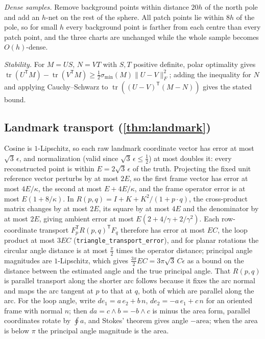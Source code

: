 \documentclass[11pt]{article}
\newcommand{\lean}[1]{\nolinkurl{#1}}
\begin{document}
\emph{Dense samples.}
Remove background points within distance $20h$ of the north pole and add an $h$-net on the rest of the sphere.
All patch points lie within $8h$ of the pole, so for small $h$ every background point is farther from each centre than every patch point, and the three charts are unchanged while the whole sample becomes $O(h)$-dense.

\emph{Stability.}
For $M=US$, $N=VT$ with $S,T$ positive definite, polar optimality gives $\operatorname{tr}(U^{\mathsf T}M)-\operatorname{tr}(V^{\mathsf T}M)\ge\tfrac12\sigma_{\min}(M)\|U-V\|_F^2$; adding the inequality for $N$ and applying Cauchy--Schwarz to $\operatorname{tr}((U-V)^{\mathsf T}(M-N))$ gives the stated bound.

\subsection{Landmark transport (\texorpdfstring{\cref{thm:landmark}}{Theorem 7.3})}
\label{app:landmark-proof}

Cosine is $1$-Lipschitz, so each raw landmark coordinate vector has error at most $\sqrt3\,\epsilon$, and normalization (valid since $\sqrt3\,\epsilon\le\tfrac12$) at most doubles it: every reconstructed point is within $E=2\sqrt3\,\epsilon$ of the truth.
Projecting the fixed unit reference vector perturbs by at most $2E$, so the first frame vector has error at most $4E/\kappa$, the second at most $E+4E/\kappa$, and the frame operator error is at most $E(1+8/\kappa)$.
In $R(p,q)=I+K+K^2/(1+p\cdot q)$, the cross-product matrix changes by at most $2E$, its square by at most $4E$ and the denominator by at most $2E$, giving ambient error at most $E(2+4/\gamma+2/\gamma^2)$.
Each row-coordinate transport $F_p^{\mathsf T}R(p,q)^{\mathsf T}F_q$ therefore has error at most $EC$, the loop product at most $3EC$ (\lean{triangle_transport_error}), and for planar rotations the circular angle distance is at most $\tfrac\pi2$ times the operator distance; principal angle magnitudes are $1$-Lipschitz, which gives $\tfrac{3\pi}2EC=3\pi\sqrt3\,C\epsilon$ as a bound on the distance between the estimated angle and the true principal angle.
That $R(p,q)$ is parallel transport along the shorter arc follows because it fixes the arc normal and maps the arc tangent at $p$ to that at $q$, both of which are parallel along the arc.
For the loop angle, write $de_1=a\,e_2+b\,n$, $de_2=-a\,e_1+c\,n$ for an oriented frame with normal $n$; then $da=c\wedge b=-b\wedge c$ is minus the area form, parallel coordinates rotate by $\oint a$, and Stokes' theorem gives angle $-\text{area}$; when the area is below $\pi$ the principal angle magnitude is the area.
\end{document}
